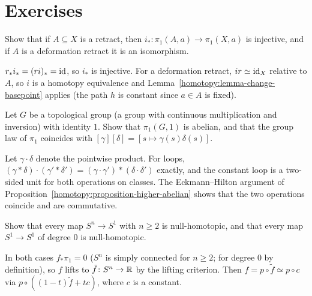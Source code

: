 \section{Exercises}\label{homotopy:section-exercises}

\begin{exercise}\label{homotopy:exercise-retract-injective}
Show that if $A \subseteq X$ is a retract, then $i_* \colon \pi_1(A, a) \to \pi_1(X, a)$ is injective, and if $A$ is a deformation retract it is an isomorphism.
\end{exercise}

\begin{solution}
$r_*i_* = (ri)_* = \mathrm{id}$, so $i_*$ is injective. For a deformation retract, $ir \simeq \mathrm{id}_X$ relative to $A$, so $i$ is a homotopy equivalence and
Lemma~\ref{homotopy:lemma-change-basepoint} applies (the path $h$ is constant since $a \in A$ is fixed).
\end{solution}

\begin{exercise}\label{homotopy:exercise-topological-group}
Let $G$ be a topological group (a group with continuous multiplication and inversion) with identity $1$. Show that $\pi_1(G, 1)$ is abelian, and that the group
law of $\pi_1$ coincides with $[\gamma][\delta] = [s \mapsto \gamma(s)\delta(s)]$.
\end{exercise}

\begin{solution}
Let $\gamma \cdot \delta$ denote the pointwise product. For loops, $(\gamma * \delta) \cdot (\gamma' * \delta') = (\gamma \cdot \gamma') * (\delta \cdot \delta')$ exactly, and
the constant loop is a two-sided unit for both operations on classes. The Eckmann--Hilton argument of Proposition~\ref{homotopy:proposition-higher-abelian} shows
that the two operations coincide and are commutative.
\end{solution}

\begin{exercise}\label{homotopy:exercise-sphere-to-circle}
Show that every map $S^n \to S^1$ with $n \geq 2$ is null-homotopic, and that every map $S^1 \to S^1$ of degree $0$ is null-homotopic.
\end{exercise}

\begin{solution}
In both cases $f_*\pi_1 = 0$ ($S^n$ is simply connected for $n \geq 2$; for degree $0$ by definition), so $f$ lifts to $\tilde{f} \colon S^n \to \mathbb{R}$ by the lifting
criterion. Then $f = p \circ \tilde{f} \simeq p \circ c$ via $p \circ ((1 - t)\tilde f + tc)$, where $c$ is a constant.
\end{solution}

